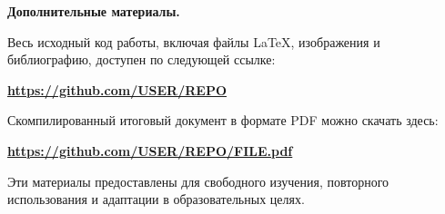 \documentclass[a4paper,12pt]{report}
\newcommand{\github}{\url{https://github.com/USER/REPO}}
\newcommand{\pdfLink}{\url{https://github.com/USER/REPO/FILE.pdf}}
\begin{document}
\textbf{Дополнительные материалы.}

Весь исходный код работы, включая файлы \LaTeX{}, изображения и библиографию, доступен по следующей ссылке:
\begin{center}
\textbf{\github}
\end{center}

Скомпилированный итоговый документ в формате PDF можно скачать здесь:
\begin{center}
\textbf{\pdfLink}
\end{center}

\noindent Эти материалы предоставлены для свободного изучения, повторного использования и адаптации в образовательных целях.


\bibliographyChapter %

\end{document}
